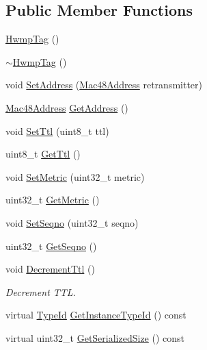 \subsection*{Public Member Functions}
\begin{DoxyCompactItemize}
\item 
\hyperlink{classns3_1_1dot11s_1_1HwmpTag_aa6d0b6a7846f88f0ab2a627507e90ee5}{Hwmp\+Tag} ()
\item 
\hyperlink{classns3_1_1dot11s_1_1HwmpTag_a36e94aa7295a9f8246da983ab145a2f8}{$\sim$\+Hwmp\+Tag} ()
\item 
void \hyperlink{classns3_1_1dot11s_1_1HwmpTag_ace2f9ed75b49634c6280ed3c5caabb96}{Set\+Address} (\hyperlink{classns3_1_1Mac48Address}{Mac48\+Address} retransmitter)
\item 
\hyperlink{classns3_1_1Mac48Address}{Mac48\+Address} \hyperlink{classns3_1_1dot11s_1_1HwmpTag_a27bbcfb2e59ca91f1ef287306cb75ade}{Get\+Address} ()
\item 
void \hyperlink{classns3_1_1dot11s_1_1HwmpTag_a03554c2faadbaeeda40862aaab819453}{Set\+Ttl} (uint8\+\_\+t ttl)
\item 
uint8\+\_\+t \hyperlink{classns3_1_1dot11s_1_1HwmpTag_a52db26903d54e1f7ae1044da436b8d09}{Get\+Ttl} ()
\item 
void \hyperlink{classns3_1_1dot11s_1_1HwmpTag_a12735d043ca86ee8d9e3a0cf82df7643}{Set\+Metric} (uint32\+\_\+t metric)
\item 
uint32\+\_\+t \hyperlink{classns3_1_1dot11s_1_1HwmpTag_abfa6162d64a3d77e8d869d40ea335785}{Get\+Metric} ()
\item 
void \hyperlink{classns3_1_1dot11s_1_1HwmpTag_a1d113829e1d8f5e88f524b8cd4cec27f}{Set\+Seqno} (uint32\+\_\+t seqno)
\item 
uint32\+\_\+t \hyperlink{classns3_1_1dot11s_1_1HwmpTag_a0d7af89abc80841a95e46cb7c8e7c144}{Get\+Seqno} ()
\item 
void \hyperlink{classns3_1_1dot11s_1_1HwmpTag_af8f7388407c758f48182ef6498ffa4e7}{Decrement\+Ttl} ()
\begin{DoxyCompactList}\small\item\em Decrement T\+TL. \end{DoxyCompactList}\item 
virtual \hyperlink{classns3_1_1TypeId}{Type\+Id} \hyperlink{classns3_1_1dot11s_1_1HwmpTag_acbfdf6e40b63b1499ef98ff6c5dae83b}{Get\+Instance\+Type\+Id} () const 
\item 
virtual uint32\+\_\+t \hyperlink{classns3_1_1dot11s_1_1HwmpTag_ab017b2c740b7c35c1a8a7ce734016024}{Get\+Serialized\+Size} () const 

\end{DoxyCompactItemize}

